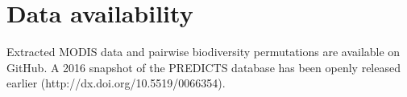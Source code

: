 \section{Data availability}
Extracted MODIS data and pairwise biodiversity permutations are available on GitHub. A 2016 snapshot of the PREDICTS database has been openly released earlier (http://dx.doi.org/10.5519/0066354).



\clearpage
%

%  
